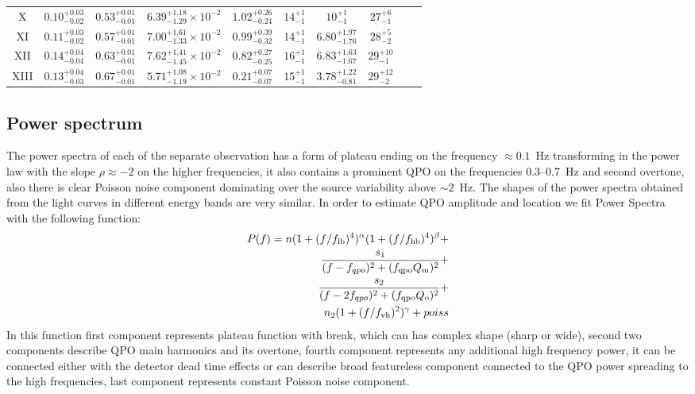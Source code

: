 \documentclass[a4paper,fleqn,usenatbib]{mnras}
\begin{document}
\begin{table}
\begin{tabular}{|c|c|c|c|c|c|c|c|c|c|}
X & $0.10_{-0.02}^{+0.03}$ & $0.53_{-0.01}^{+0.01}$ & $6.39_{-1.29}^{+1.18}\times10^{-2}$ & $1.02_{-0.24}^{+0.26}$ & $14_{-1}^{+1}$ & $10_{-1}^{+1}$ & $27_{-1}^{+6}$ & & \\
XI & $0.11_{-0.02}^{+0.03}$ & $0.57_{-0.01}^{+0.01}$ & $7.00_{-1.33}^{+1.61}\times10^{-2}$ & $0.99_{-0.32}^{+0.39}$ & $14_{-1}^{+1}$ & $6.80_{-1.76}^{+1.97}$ & $28_{-2}^{+5}$ & & \\
XII & $0.14_{-0.04}^{+0.04}$ & $0.63_{-0.01}^{+0.01}$ & $7.62_{-1.45}^{+1.41}\times10^{-2}$ & $0.82_{-0.25}^{+0.27}$ & $16_{-1}^{+1}$ & $6.83_{-1.67}^{+1.63}$ & $29_{-1}^{+10}$ & & \\
XIII & $0.13_{-0.03}^{+0.04}$ & $0.67_{-0.01}^{+0.01}$ & $5.71_{-1.19}^{+1.08}\times10^{-2}$ & $0.21_{-0.07}^{+0.07}$ & $15_{-1}^{+1}$ & $3.78_{-0.81}^{+1.22}$ & $29_{-2}^{+12}$ & & \\
\hline
\end{tabular}

\end{table}

\subsection{Power spectrum}
    The power spectra of each of the separate observation has a form of plateau ending on the frequency $\approx0.1$~Hz transforming in the power law with the slope $\rho\approx-2$ on the higher frequencies, it also contains a prominent QPO on the frequencies 0.3--0.7~Hz and second overtone, also there is clear Poisson noise component dominating over the source variability above $\sim2$~Hz.
    The shapes of the power spectra obtained from the light curves in different energy bands are very similar.
    In order to estimate QPO amplitude and location we fit Power Spectra with the following function:
\begin{equation}
        \begin{split}
        P(f) = n (1 + (f/f_{\rm lb})^4)^{\alpha} (1 + (f/f_{\rm hb})^4)^{\beta} + \\
        \frac{s_1}{(f - f_{qpo})^2 + (f_{\rm qpo} Q_{\rm m})^2} +\\
        \frac{s_2}{(f - 2f_{qpo})^2 + (f_{\rm qpo} Q_{\rm o})^2} + \\
        n_2 (1 + (f/f_{\rm vh})^2)^{\gamma} + poiss
\end{split}
        \label{eq:complex_fit}
\end{equation}
In this function first component represents plateau function with break, which can has complex shape (sharp or wide), second two components describe QPO main harmonics and its overtone, fourth component represents any additional high frequency power, it can be connected either with the detector dead time effects or can describe broad featureless component connected to the QPO power spreading to the high frequencies, last component represents constant Poisson noise component.
\end{document}
